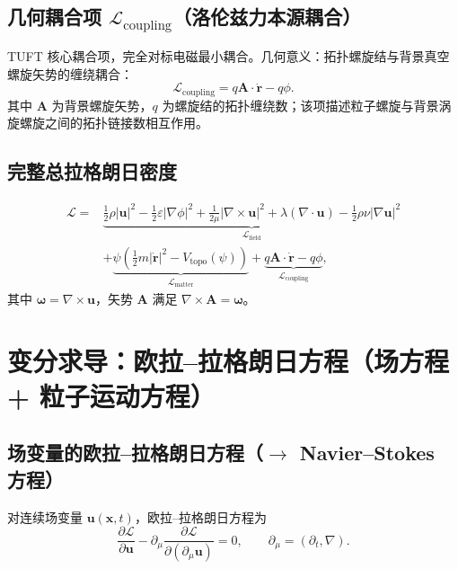 \documentclass[11pt]{ctexart}
\newcommand{\ve}[1]{\bm{#1}}                         %
\newcommand{\Ltot}{\mathcal{L}}                      %
\newcommand{\Lf}{\mathcal{L}_{\mathrm{field}}}       %
\newcommand{\Lm}{\mathcal{L}_{\mathrm{matter}}}      %
\newcommand{\Lc}{\mathcal{L}_{\mathrm{coupling}}}    %
\newcommand{\Vtopo}{V_{\mathrm{topo}}}               %
\begin{document}
\subsection{几何耦合项 $\Lc$（洛伦兹力本源耦合）}

TUFT 核心耦合项，完全对标电磁最小耦合。几何意义：拓扑螺旋结与背景真空螺旋矢势的缠绕耦合：
\begin{equation}
\Lc=q\ve{A}\cdot\dot{\ve{r}}-q\phi.
\label{eq:Lcoupling}
\end{equation}
其中 $\ve{A}$ 为背景螺旋矢势，$q$ 为螺旋结的拓扑缠绕数；该项描述粒子螺旋与背景涡旋螺旋之间的拓扑链接数相互作用。

\subsection{完整总拉格朗日密度}

\begin{equation}\label{eq:totalL}
\begin{aligned}
\Ltot
={}&\underbrace{\frac{1}{2}\rho|\ve{u}|^{2}-\frac{1}{2}\varepsilon|\nabla\phi|^{2}+\frac{1}{2\mu}|\nabla\times\ve{u}|^{2}
+\lambda(\nabla\cdot\ve{u})-\frac{1}{2}\rho\nu|\nabla\ve{u}|^{2}}_{\Lf}\\
&+\underbrace{\psi\left(\frac{1}{2}m|\dot{\ve{r}}|^{2}-\Vtopo(\psi)\right)}_{\Lm}
+\underbrace{q\ve{A}\cdot\dot{\ve{r}}-q\phi}_{\Lc},
\end{aligned}
\end{equation}
其中 $\ve{\omega}=\nabla\times\ve{u}$，矢势 $\ve{A}$ 满足 $\nabla\times\ve{A}=\ve{\omega}$。

\section{变分求导：欧拉--拉格朗日方程（场方程 + 粒子运动方程）}

\subsection{场变量的欧拉--拉格朗日方程（$\to$ Navier--Stokes 方程）}

对连续场变量 $\ve{u}(\ve{x},t)$，欧拉--拉格朗日方程为
\begin{equation}
\frac{\partial\Ltot}{\partial\ve{u}}
-\partial_{\mu}\frac{\partial\Ltot}{\partial(\partial_{\mu}\ve{u})}=0,\qquad
\partial_{\mu}=(\partial_{t},\nabla).
\label{eq:ELfield}
\end{equation}
\end{document}
